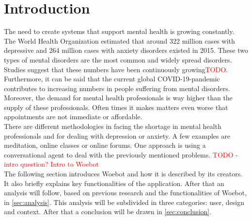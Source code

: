 \section{Introduction}
The need to create systems that support mental health is growing constantly.
The World Health Organization estimated that around 322 million cases with depressive and 264 million cases with anxiety disorders existed in 2015\cite{who2017}.
These two types of mental disorders are the most common and widely spread disorders.
Studies suggest that these numbers have been continuously growing\cite{}\textcolor{red}{TODO}.
Furthermore, it can be said that the current global COVID-19-pandemic contributes to increasing numbers in people suffering from mental disorders\cite{corona-mental}.
Moreover, the demand for mental health professionals is way higher than the supply of these professionals\cite{indian-shortage, rural-shortage}.
Often times it makes matters even worse that appointments are not immediate or affordable.\\

There are different methodologies in facing the shortage in mental health professionals and for dealing with depression or anxiety.
A few examples are meditation, online classes or online forums.
One approach is using a conversational agent to deal with the previously mentioned problems.
\textcolor{red}{TODO - intro question?} \textcolor{red}{Intro to Woebot}\\

The following section introduces Woebot and how it is described by its creators.
It also briefly explains key functionalities of the application.
After that an analysis will follow, based on previous research and the functionalities of Woebot, in \autoref{sec:analysis}.
This analysis will be subdivided in three categories: user, design and context.
After that a conclusion will be drawn in \autoref{sec:conclusion}.
